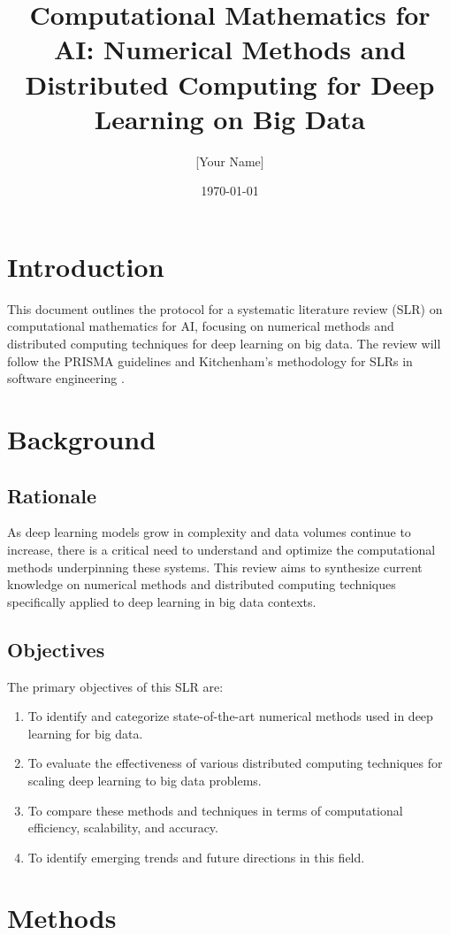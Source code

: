 \documentclass[a4paper,12pt]{article}
\title{Computational Mathematics for AI: Numerical Methods and Distributed Computing for Deep Learning on Big Data}
\author{[Your Name]}
\date{\today}
\begin{document}
\maketitle

\section{Introduction}
This document outlines the protocol for a systematic literature review (SLR) on computational mathematics for AI, focusing on numerical methods and distributed computing techniques for deep learning on big data. The review will follow the PRISMA guidelines \citep{moher2009preferred} and Kitchenham's methodology for SLRs in software engineering \citep{kitchenham2007guidelines}.

\section{Background}
\subsection{Rationale}
As deep learning models grow in complexity and data volumes continue to increase, there is a critical need to understand and optimize the computational methods underpinning these systems. This review aims to synthesize current knowledge on numerical methods and distributed computing techniques specifically applied to deep learning in big data contexts.

\subsection{Objectives}
The primary objectives of this SLR are:
\begin{enumerate}
    \item To identify and categorize state-of-the-art numerical methods used in deep learning for big data.
    \item To evaluate the effectiveness of various distributed computing techniques for scaling deep learning to big data problems.
    \item To compare these methods and techniques in terms of computational efficiency, scalability, and accuracy.
    \item To identify emerging trends and future directions in this field.
\end{enumerate}

\section{Methods}
\end{document}
